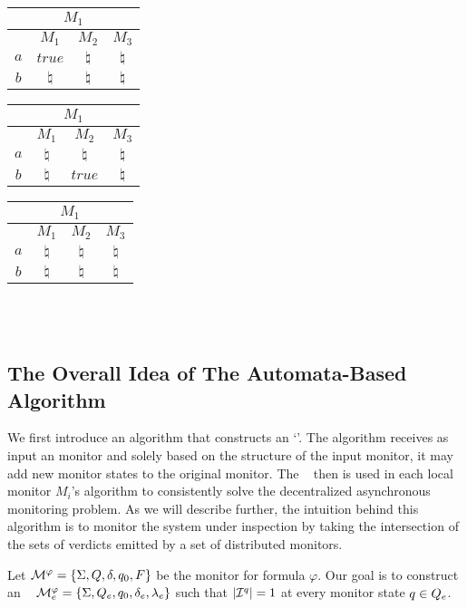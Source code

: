 \iffalse

\begin{tabular}{| c |c |c |c|}
\multicolumn{4}{c}{$M_1$} \\
\hline
&$M_1$&$M_2$ & $M_3$\\
\hline
$a$ & $true$ & $\natural$ & $\natural$ \\
$b$ & $\natural$ & $\natural$ & $\natural$\\
\hline
\end{tabular}  
\quad
\begin{tabular}{| c |c |c |c|}
\multicolumn{4}{c}{$M_1$} \\
\hline
&$M_1$&$M_2$ & $M_3$\\
\hline
$a$ & $\natural$ & $\natural$ & $\natural$ \\
$b$ & $\natural$ & $true$ & $\natural$\\
\hline
\end{tabular}  
\quad
\begin{tabular}{| c |c |c |c|}
\multicolumn{4}{c}{$M_1$} \\
\hline
&$M_1$&$M_2$ & $M_3$\\
\hline
$a$ & $\natural$ & $\natural$ & $\natural$ \\
$b$ & $\natural$ & $\natural$ & $\natural$\\
\hline
\end{tabular}  \\ \\








\subsection{The Overall Idea of The Automata-Based Algorithm}



We first introduce an algorithm that constructs an `\textit{\Exltl}'. The algorithm receives as input an \LTLtri monitor and solely based on the structure of the input monitor, it may add new monitor states to the original \LTLtri monitor. The \Exltl~ then is used in each local monitor $M_i$'s algorithm to consistently solve the decentralized asynchronous monitoring problem. As we will describe further, the intuition behind this algorithm is to monitor the system under inspection by taking the intersection of the sets of verdicts emitted by a set of distributed monitors. 


Let $\mathcal{M}^\varphi=\{\Sigma, Q, \delta, q_0, F\}$ be the \LTLtri monitor for \LTL formula $\varphi$. Our goal is to construct an \Exltl~ $\mathcal{M}_e^\varphi =  \{ \Sigma, Q_e, q_0, \delta_e , \lambda_e\}$ such that $|\mathcal{I}^q|=1$ at every monitor state $q \in Q_e$.




